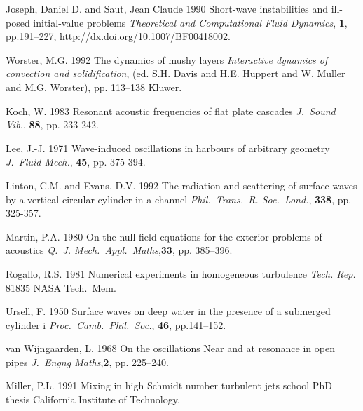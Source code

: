 \documentclass[lineno]{jfm}
\begin{document}
\begin{thebibliography}{99}
 {\sc Joseph, Daniel D. and Saut, Jean Claude} 1990 Short-wave instabilities and ill-posed initial-value problems {\it Theoretical and Computational Fluid Dynamics}, {\bf 1},  pp.191--227,  {\url{http://dx.doi.org/10.1007/BF00418002}}.

{ \sc  Worster, M.G.} 1992 The dynamics of mushy layers {\it Interactive dynamics of convection and solidification},
{(ed. S.H. Davis and H.E. Huppert and W. Muller and M.G. Worster)}, pp. 113--138 {Kluwer}.

{\sc Koch, W.} 1983 Resonant acoustic frequencies of flat plate cascades {\it J.~Sound Vib.}, {\bf 88}, pp. 233-242.

{\sc Lee,  J.-J.}  1971 Wave-induced oscillations in harbours of arbitrary geometry {\it J.~Fluid Mech.}, {\bf 45}, pp. 375-394.

 {\sc  Linton, C.M. and  Evans, D.V.} 1992 The radiation and scattering of surface waves by a vertical circular cylinder in a channel {\it Phil.\ Trans.\ R. Soc.\ Lond.}, {\bf 338}, pp. 325-357.

 {\sc  Martin, P.A.} 1980 On the null-field equations for the exterior problems of acoustics {\it Q.~J. Mech.\ Appl.\ Maths},{\bf 33}, pp. 385--396.

 {\sc Rogallo,  R.S.} 1981 Numerical experiments in homogeneous turbulence  { {\it Tech. Rep.} 81835}  {NASA Tech.\ Mem}.

{\sc  Ursell, F.} 1950 Surface waves on deep water in the presence of a submerged cylinder i {\it Proc.\ Camb.\ Phil.\ Soc.}, {\bf 46}, pp.141--152.

{\sc van Wijngaarden, L.} 1968 On the oscillations Near and at resonance in open pipes {\it J.~Engng Maths},{\bf 2}, pp. 225--240.

{ \sc  Miller, P.L.} 1991 Mixing in high Schmidt number turbulent jets {school {PhD thesis}} {California Institute of Technology}.

\end{thebibliography}

\end{document}
